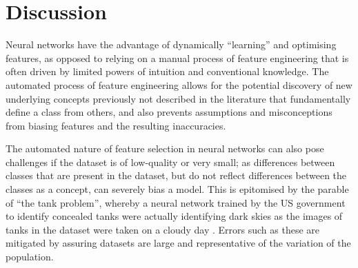 \section{Discussion}

Neural networks have the advantage of dynamically ``learning'' and optimising features, as opposed to relying on a manual process of feature engineering that is often driven by limited powers of intuition and conventional knowledge. The automated process of feature engineering allows for the potential discovery of new underlying concepts previously not described in the literature that fundamentally define a class from others, and also prevents assumptions and misconceptions from biasing features and the resulting inaccuracies.\par


The automated nature of feature selection in neural networks can also pose challenges if the dataset is of low-quality or very small; as differences between classes that are present in the dataset, but do not reflect differences between the classes as a concept, can severely bias a model. This is epitomised by the parable of ``the tank problem'', whereby a neural network trained by the US government to identify concealed tanks were actually identifying dark skies as the images of tanks in the dataset were taken on a cloudy day \citep{dreyfus1992}. Errors such as these are mitigated by assuring datasets are large and representative of the variation of the population.\par

 